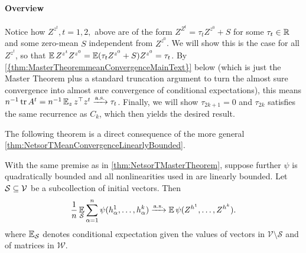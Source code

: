 \documentclass[main.tex]{subfiles}
\begin{document}
\paragraph{Overview}
Notice how $Z^{z^t}, t=1,2,$ above are of the form $Z^{Z^t} = \tau_t Z^{z^0} + S$ for some $\tau_t\in\mathbb{R}$ and some zero-mean $S$ independent from $Z^{z^0}$.
We will show this is the case for all $Z^{z^t}$, so that $\operatorname*{\mathbb{E}} Z^{z^t} Z^{z^0} = \operatorname*{\mathbb{E}} (\tau_t Z^{z^0} + S) Z^{z^0} = \tau_t$.
By \cref{{thm:MasterTheoremmeanConvergenceMainText}} below (which is just the Master Theorem plus a standard truncation argument to turn the almost sure convergence into almost sure convergence of conditional expectations), this means ${n}^{-1} \operatorname{tr} A^t = {n}^{-1} \operatorname*{\mathbb{E}}_z z^\top z^t \xrightarrow{\mathrm{a.s.}} \tau_t$.
Finally, we will show $\tau_{2k+1}=0$ and $\tau_{2k}$ satisfies the same recurrence as $C_{k}$, which then yields the desired result.

The following theorem is a direct consequence of the more general \cref{thm:NetsorTMeanConvergenceLinearlyBounded}.
\begin{thm}\label{thm:MasterTheoremmeanConvergenceMainText}
    With the same premise as in \cref{thm:NetsorTMasterTheorem}, suppose further $\psi$ is quadratically bounded and all nonlinearities used in  are linearly bounded.
    Let $\mathcal S \subseteq \mathcal V$ be a subcollection of initial vectors.
    Then
    \begin{equation}
    \f 1n \EV_{\mathcal S} \sum_{\alpha=1}^{n}\psi(h_{\alpha}^{1},\ldots,h_{\alpha}^{k})
    \asto
    \EV\psi(Z^{h^{1}},\ldots,Z^{h^{k}}).
    \label{eqn:condmeanconvergenceMainText}
    \end{equation}
    where $\operatorname*{\mathbb{E}}_{\mathcal S}$ denotes conditional expectation given the values of vectors in $\mathcal V \setminus \mathcal S$ and of matrices in $\mathcal W$.
\end{thm}
\end{document}
